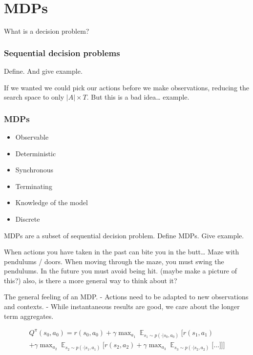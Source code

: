\chapter{MDPs}

What is a decision problem?

\hypertarget{sequential-decision-problems}{%
\subsection{Sequential decision
problems}\label{sequential-decision-problems}}

Define. And give example.

If we wanted we could pick our actions before we make observations,
reducing the search space to only \(|A| \times T\). But this is a bad
idea\ldots{} example.

\hypertarget{mdps}{%
\subsection{MDPs}\label{mdps}}

\begin{itemize}
\tightlist
\item
  Observable
\item
  Deterministic
\item
  Synchronous
\item
  Terminating
\item
  Knowledge of the model
\item
  Discrete
\end{itemize}

MDPs are a subset of sequential decision problem. Define MDPs. Give
example.

When actions you have taken in the past can bite you in the butt\ldots{}
Maze with pendulums / doors. When moving through the maze, you must
swing the pendulums. In the future you must avoid being hit. (maybe make
a picture of this?) also, is there a more general way to think about it?

The general feeling of an MDP. - Actions need to be adapted to new
observations and contexts. - While instantaneous results are good, we
care about the longer term aggregates.

\begin{align*}
Q^{\pi}(s_0, a_0) = r(s_0, a_0)
+ \gamma \mathop{\text{max}}_{a_1} \mathop{\mathbb E}_{s_1\sim p(\cdot | s_0, a_0)} \Bigg[ r(s_1, a_1) \\
+ \gamma \mathop{\text{max}}_{a_2} \mathop{\mathbb E}_{s_2\sim p(\cdot | s_1, a_1)} \bigg[r(s_2, a_2)
+ \gamma \mathop{\text{max}}_{a_3} \mathop{\mathbb E}_{s_3\sim p(\cdot | s_2, a_2)} \Big[
\dots \Big] \bigg] \Bigg]
\end{align*}

